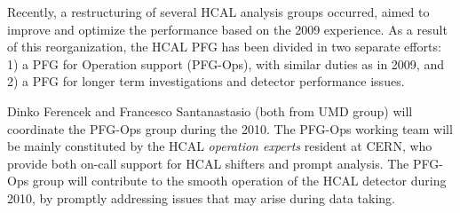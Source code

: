 \documentclass[a4paper,11pt]{article}
\begin{document}
Recently, a restructuring of several HCAL analysis groups occurred, 
aimed to improve and optimize the performance based on the 2009 experience. 
As a result of this reorganization, the HCAL PFG has been divided in 
two separate efforts: 1) a PFG for Operation support (PFG-Ops), with similar 
duties as in 2009, and 2) a PFG for longer term investigations and 
detector performance issues.

Dinko Ferencek and Francesco Santanastasio (both from UMD group) 
will coordinate the PFG-Ops group during the 2010. 
The PFG-Ops working team will be mainly constituted by the HCAL \textit{operation experts} resident at CERN, 
who provide both on-call support for HCAL shifters and prompt analysis. 
The PFG-Ops group will contribute to the smooth operation of the HCAL detector during 2010, 
by promptly addressing issues that may arise during data taking.
%
\end{document}
